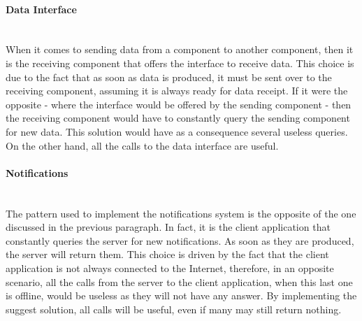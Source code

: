 \documentclass[../../DD.tex]{subfiles}
\begin{document}
	\paragraph{Data Interface}\mbox{}\\
	\indent When it comes to sending data from a component to another component, then it is the receiving component that offers the interface to receive data. This choice is due to the fact that as soon as data is produced, it must be sent over to the receiving component, assuming it is always ready for data receipt. If it were the opposite - where the interface would be offered by the sending component - then the receiving component would have to constantly query the sending component for new data. This solution would have as a consequence several useless queries. On the other hand, all the calls to the data interface are useful.

	\paragraph{Notifications}\mbox{}\\
	\indent The pattern used to implement the notifications system is the opposite of the one discussed in the previous paragraph. In fact, it is the client application that constantly queries the server for new notifications. As soon as they are produced, the server will return them. This choice is driven by the fact that the client application is not always connected to the Internet, therefore, in an opposite scenario, all the calls from the server to the client application, when this last one is offline, would be useless as they will not have any answer. By implementing the suggest solution, all calls will be useful, even if many may still return nothing.
\end{document}
